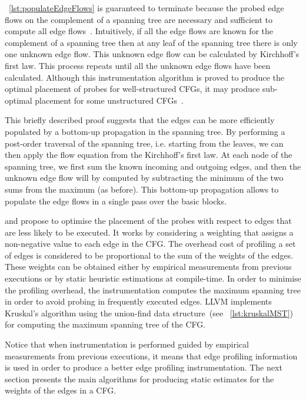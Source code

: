 \lstlistingname~\ref{lst:populateEdgeFlows} is guaranteed to terminate because the probed edge flows on the complement of a spanning tree are necessary and sufficient to compute all edge flows~\citep{nahapetian73,forman81}.
Intuitively, if all the edge flows are known for the complement of a spanning tree then at any leaf of the spanning tree there is only one unknown edge flow.
This unknown edge flow can be calculated by Kirchhoff's first law.
This process repeats until all the unknown edge flows have been calculated.
Although this instrumentation algorithm is proved to produce the optimal placement of probes for well-structured CFGs, it may produce sub-optimal placement for some unstructured CFGs~\citep{ball94}.

This briefly described proof suggests that the edges can be more efficiently populated by a bottom-up propagation in the spanning tree.
By performing a post-order traversal of the spanning tree, i.e. starting from the leaves, we can then apply the flow equation from the Kirchhoff's first law.
At each node of the spanning tree, we first sum the known incoming and outgoing edges, and then the unknown edge flow will by computed by subtracting the minimum of the two sums from the maximum (as before).
This bottom-up propagation allows to populate the edge flows in a single pass over the basic blocks.

\cite{forman81} and \cite{ball94} propose to optimise the placement of the probes with respect to edges that are less likely to be executed.
It works by considering a weighting that assigns a non-negative value to each edge in the CFG.
The overhead cost of profiling a set of edges is considered to be proportional to the sum of the weights of the edges.
These weights can be obtained either by empirical measurements from previous executions or by static heuristic estimations at compile-time.
In order to minimise the profiling overhead, the instrumentation computes the maximum spanning tree in order to avoid probing in frequently executed edges.
LLVM implements Kruskal's algorithm using the union-find data structure~(see \lstlistingname~\ref{lst:kruskalMST})
for computing the maximum spanning tree of the CFG.

Notice that when instrumentation is performed guided by empirical measurements from previous executions, it means that edge profiling information is used in order to produce a better edge profiling instrumentation.
The next section presents the main algorithms for producing static estimates for the weights of the edges in a CFG.

